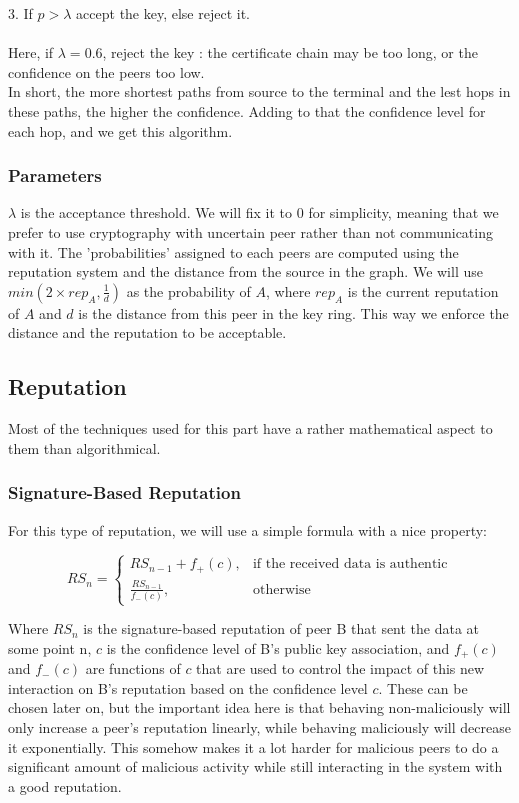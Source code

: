 \documentclass[]{article}
\begin{document}
3. If $p > \lambda$ accept the key, else reject it. \\\\
Here, if $\lambda = 0.6$, reject the key : the certificate chain may be too long, or the confidence on the peers too low.\\


In short, the more shortest paths from source to the terminal and the lest hops in these paths, the higher the confidence. Adding to that the confidence level for each hop, and we get this algorithm.

\subsubsection{Parameters}
\label{sec:parameters}
$\lambda$ is the acceptance threshold. We will fix it to 0 for simplicity, meaning that we prefer to use cryptography with uncertain peer rather than not communicating with it. \newline
The 'probabilities' assigned to each peers are computed using the reputation system and the distance from the source in the graph. We will use $min(2 \times rep_A, \frac{1}{d})$ as the probability of $A$, where $rep_A$ is the current reputation of $A$ and $d$ is the distance from this peer in the key ring. This way we enforce the distance and the reputation to be acceptable.

\subsection{Reputation}
\label{sec:rep-spec}
Most of the techniques used for this part have a rather mathematical aspect to them than algorithmical.

\subsubsection{Signature-Based Reputation}
For this type of reputation, we will use a simple formula with a nice property:

\begin{equation}
    \label{eq:sig-rep}
    RS_n = 
    \begin{cases}
        RS_{n-1} + f_+(c),       & \text{if the received data is authentic}
        \\
        \frac{RS_{n-1}}{f_-(c)}, & \text{otherwise}
    \end{cases}
\end{equation}

\noindent
Where $RS_n$ is the signature-based reputation of peer B that sent the data at some point n, $c$ is the confidence level of B's public key association, and $f_+(c)$ and $f_-(c)$ are functions of $c$ that are used to control the impact of this new interaction on B's reputation based on the confidence level $c$.
These can be chosen later on, but the important idea here is that behaving non-maliciously will only increase a peer's reputation linearly, while behaving maliciously will decrease it exponentially.
This somehow makes it a lot harder for malicious peers to do a significant amount of malicious activity while still interacting in the system with a good reputation.
\end{document}

